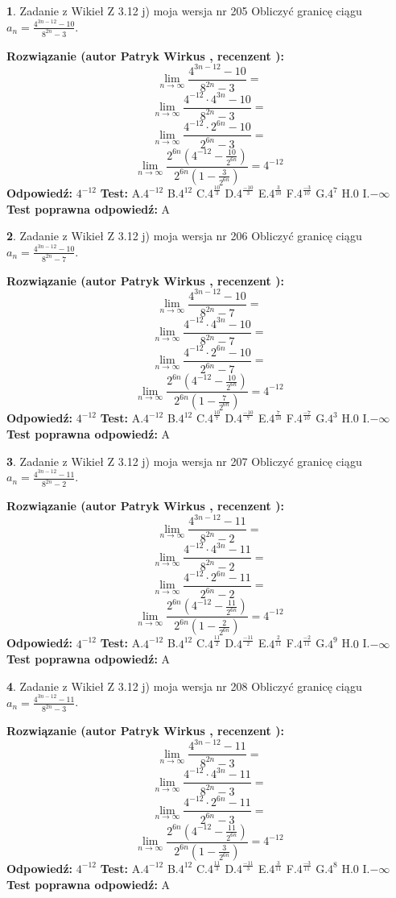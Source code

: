 \documentclass[12pt, a4paper]{article}
\theoremstyle{definition} %
\newtheorem{zad}{}
\newcommand{\zadStart}[1]{\begin{zad}#1\newline}
\newcommand{\zadStop}{\end{zad}}
\newcommand{\rozwStart}[2]{\noindent \textbf{Rozwiązanie (autor #1 , recenzent #2): }\newline}
\newcommand{\rozwStop}{\newline}
\newcommand{\odpStart}{\noindent \textbf{Odpowiedź:}\newline}
\newcommand{\odpStop}{\newline}
\newcommand{\testStart}{\noindent \textbf{Test:}\newline}
\newcommand{\testStop}{\newline}
\newcommand{\kluczStart}{\noindent \textbf{Test poprawna odpowiedź:}\newline}
\newcommand{\kluczStop}{\newline}
\begin{document}
\zadStart{Zadanie z Wikieł Z 3.12 j) moja wersja nr 205}
Obliczyć granicę ciągu $a_{n}=\frac{4^{3n-12}-10}{8^{2n}-3}$.
\zadStop
\rozwStart{Patryk Wirkus}{}
$$\lim\limits_{n\to\infty}\frac{4^{3n-12}-10}{8^{2n}-3}=$$
$$\lim\limits_{n\to\infty}\frac{4^{-12} \cdot 4^{3n}-10}{8^{2n}-3}=$$
$$\lim\limits_{n\to\infty}\frac{4^{-12} \cdot 2^{6n}-10}{2^{6n}-3}=$$
$$\lim\limits_{n\to\infty}\frac{2^{6n}(4^{-12} - \frac{10}{2^{6n}})}{2^{6n}(1-\frac{3}{2^{6n}})}= 4^{-12}$$
\rozwStop
\odpStart
$4^{-12}$
\odpStop
\testStart
A.$4^{-12}$
B.$4^{12}$
C.$4^{\frac{10}{3}}$
D.$4^{\frac{-10}{3}}$
E.$4^{\frac{3}{10}}$
F.$4^{\frac{-3}{10}}$
G.$4^{7}$
H.$0$
I.$-\infty$
\testStop
\kluczStart
A
\kluczStop



\zadStart{Zadanie z Wikieł Z 3.12 j) moja wersja nr 206}
Obliczyć granicę ciągu $a_{n}=\frac{4^{3n-12}-10}{8^{2n}-7}$.
\zadStop
\rozwStart{Patryk Wirkus}{}
$$\lim\limits_{n\to\infty}\frac{4^{3n-12}-10}{8^{2n}-7}=$$
$$\lim\limits_{n\to\infty}\frac{4^{-12} \cdot 4^{3n}-10}{8^{2n}-7}=$$
$$\lim\limits_{n\to\infty}\frac{4^{-12} \cdot 2^{6n}-10}{2^{6n}-7}=$$
$$\lim\limits_{n\to\infty}\frac{2^{6n}(4^{-12} - \frac{10}{2^{6n}})}{2^{6n}(1-\frac{7}{2^{6n}})}= 4^{-12}$$
\rozwStop
\odpStart
$4^{-12}$
\odpStop
\testStart
A.$4^{-12}$
B.$4^{12}$
C.$4^{\frac{10}{7}}$
D.$4^{\frac{-10}{7}}$
E.$4^{\frac{7}{10}}$
F.$4^{\frac{-7}{10}}$
G.$4^{3}$
H.$0$
I.$-\infty$
\testStop
\kluczStart
A
\kluczStop



\zadStart{Zadanie z Wikieł Z 3.12 j) moja wersja nr 207}
Obliczyć granicę ciągu $a_{n}=\frac{4^{3n-12}-11}{8^{2n}-2}$.
\zadStop
\rozwStart{Patryk Wirkus}{}
$$\lim\limits_{n\to\infty}\frac{4^{3n-12}-11}{8^{2n}-2}=$$
$$\lim\limits_{n\to\infty}\frac{4^{-12} \cdot 4^{3n}-11}{8^{2n}-2}=$$
$$\lim\limits_{n\to\infty}\frac{4^{-12} \cdot 2^{6n}-11}{2^{6n}-2}=$$
$$\lim\limits_{n\to\infty}\frac{2^{6n}(4^{-12} - \frac{11}{2^{6n}})}{2^{6n}(1-\frac{2}{2^{6n}})}= 4^{-12}$$
\rozwStop
\odpStart
$4^{-12}$
\odpStop
\testStart
A.$4^{-12}$
B.$4^{12}$
C.$4^{\frac{11}{2}}$
D.$4^{\frac{-11}{2}}$
E.$4^{\frac{2}{11}}$
F.$4^{\frac{-2}{11}}$
G.$4^{9}$
H.$0$
I.$-\infty$
\testStop
\kluczStart
A
\kluczStop



\zadStart{Zadanie z Wikieł Z 3.12 j) moja wersja nr 208}
Obliczyć granicę ciągu $a_{n}=\frac{4^{3n-12}-11}{8^{2n}-3}$.
\zadStop
\rozwStart{Patryk Wirkus}{}
$$\lim\limits_{n\to\infty}\frac{4^{3n-12}-11}{8^{2n}-3}=$$
$$\lim\limits_{n\to\infty}\frac{4^{-12} \cdot 4^{3n}-11}{8^{2n}-3}=$$
$$\lim\limits_{n\to\infty}\frac{4^{-12} \cdot 2^{6n}-11}{2^{6n}-3}=$$
$$\lim\limits_{n\to\infty}\frac{2^{6n}(4^{-12} - \frac{11}{2^{6n}})}{2^{6n}(1-\frac{3}{2^{6n}})}= 4^{-12}$$
\rozwStop
\odpStart
$4^{-12}$
\odpStop
\testStart
A.$4^{-12}$
B.$4^{12}$
C.$4^{\frac{11}{3}}$
D.$4^{\frac{-11}{3}}$
E.$4^{\frac{3}{11}}$
F.$4^{\frac{-3}{11}}$
G.$4^{8}$
H.$0$
I.$-\infty$
\testStop
\kluczStart
A
\kluczStop
\end{document}
